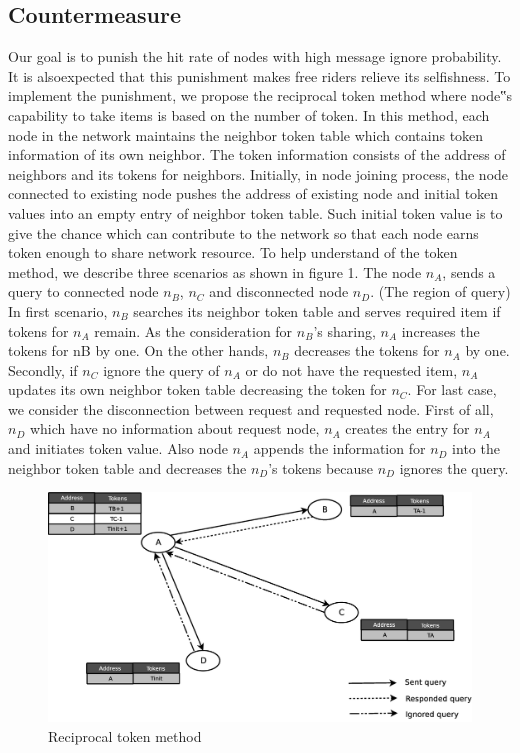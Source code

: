\documentclass[12pt,journal,draftcls,letterpaper,onecolumn]{IEEEtran}
\begin{document}
\subsection{Countermeasure}\label{sec:countermeasure}
Our goal is to punish the hit rate of nodes with high message ignore probability. 
It is alsoexpected that this punishment makes free riders relieve its selfishness. To implement the
punishment, we propose the reciprocal token method where node‟s capability to take items is
based on the number of token. In this method, each node in the network maintains the
neighbor token table which contains token information of its own neighbor. The token
information consists of the address of neighbors and its tokens for neighbors. Initially, in
node joining process, the node connected to existing node pushes the address of existing node
and initial token values into an empty entry of neighbor token table. Such initial token value
is to give the chance which can contribute to the network so that each node earns token
enough to share network resource. To help understand of the token method, we describe three
scenarios as shown in figure 1. The node $n_A$, sends a query to connected node $n_B$, $n_C$ and
disconnected node $n_D$. (The region of query) In first scenario, $n_B$ searches its neighbor token
table and serves required item if tokens for $n_A$ remain. As the consideration for $n_B$'s sharing,
$n_A$ increases the tokens for nB by one. On the other hands, $n_B$ decreases the tokens for $n_A$ by
one. Secondly, if $n_C$ ignore the query of $n_A$ or do not have the requested item, $n_A$ updates its
own neighbor token table decreasing the token for $n_C$. For last case, we consider the
disconnection between request and requested node. First of all, $n_D$ which have no information
about request node, $n_A$ creates the entry for $n_A$ and initiates token value. Also node $n_A$
appends the information for $n_D$ into the neighbor token table and decreases the $n_D$'s tokens
because $n_D$ ignores the query.

\begin{figure}
\centering
\includegraphics[width=5in]{token}
\caption{Reciprocal token method} 
\label{fig:token}
\end{figure}
\end{document}
